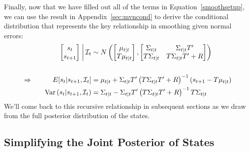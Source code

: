 \documentclass[a4paper,12pt]{article}
\begin{document}
Finally, now that we have filled out all of the terms in
Equation~\ref{smoothsetup}, we can use the result in
Appendix~\ref{sec:mvncond} to derive the conditional distribution that
represents the key relationship in smoothing given normal errors:
\begin{alignat}{3}
  &&\left. \begin{bmatrix} s_t \\ s_{t+1} \end{bmatrix} \;\right\rvert
    \mathcal{I}_t
    &\sim N\left( 
    \begin{bmatrix} \mu_{t|t} \\ T\mu_{t|t} \end{bmatrix}, 
    \begin{bmatrix} \Sigma_{t|t} & \Sigma_{t|t}T' \\ 
                    T\Sigma_{t|t} & T\Sigma_{t|t} T'+R \end{bmatrix}
    \right) \notag\\\label{smoothresult}\\
  \Rightarrow \quad
  &&E[s_t|s_{t+1}, \mathcal{I}_t] &= 
      \mu_{t|t} + \Sigma_{t|t}T'\left(T\Sigma_{t|t} T'+R\right)^{-1}
      (s_{t+1}-T\mu_{t|t}) \notag\\
  &&\text{Var}\left(s_t|s_{t+1},\mathcal{I}_t\right)
    &= \Sigma_{t|t} - \Sigma_{t|t}T' \left(T\Sigma_{t|t} T'+R\right)^{-1}
      T\Sigma_{t|t}
  \notag
\end{alignat}
We'll come back to this recursive relationship in subsequent sections as
we draw from the full posterior distribution of the states.


\subsection{Simplifying the Joint Posterior of States}
\end{document}
